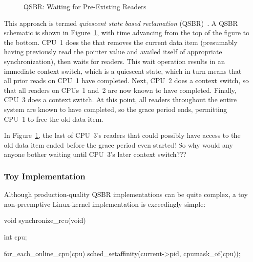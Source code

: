 \begin{figure}[tb]
\centering
{}
\caption{QSBR: Waiting for Pre-Existing Readers}
\label{fig:defer:QSBR: Waiting for Pre-Existing Readers}
\end{figure}

This approach is termed \emph{quiescent state based reclamation}
(QSBR)~\cite{ThomasEHart2006a}.
A QSBR schematic is shown in
Figure~\ref{fig:defer:QSBR: Waiting for Pre-Existing Readers},
with time advancing from the top of the figure to the bottom.
CPU~1 does the  that removes the current data
item (presumably having previously read the pointer value and
availed itself of appropriate synchronization), then waits
for readers.
This wait operation results in an immediate context switch, which is
a quiescent state, which in turn means that all prior reads on CPU~1
have completed.
Next, CPU~2 does a context switch, so that all readers on CPUs~1 and~2
are now known to have completed.
Finally, CPU~3 does a context switch.
At this point, all readers throughout the entire system are known to
have completed, so the grace period ends, permitting CPU~1 to free
the old data item.

\QuickQuiz{}
	In Figure~\ref{fig:defer:QSBR: Waiting for Pre-Existing Readers},
	the last of CPU~3's readers that could possibly have
	access to the old data item ended before the grace period
	even started!
	So why would any anyone bother waiting until CPU~3's later context
	switch???
 \QuickQuizEnd

\subsubsection{Toy Implementation}
\label{sec:defer:Toy Implementation}

Although production-quality QSBR implementations can be quite complex,
a toy non-preemptive Linux-kernel implementation is exceedingly simple:

\begin{VerbatimN}[samepage=true]
void synchronize_rcu(void)
{
	int cpu;

	for_each_online_cpu(cpu)
		sched_setaffinity(current->pid, cpumask_of(cpu));
}
\end{VerbatimN}

